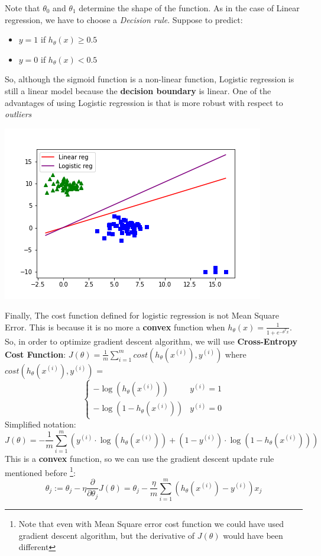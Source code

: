 Note that $\theta_{0}$ and $\theta_{1}$ determine the shape of the function.\newline
As in the case of Linear regression, we have to choose a \textit{Decision rule}. Suppose to predict: 
\begin{itemize}
    \item $y = 1$ if $h_{\theta}(x) \geq 0.5$
    \item $y = 0$ if $h_{\theta}(x) < 0.5$ 
\end{itemize}
So, although the sigmoid function is a non-linear function, Logistic regression is still a linear model because the \textbf{decision boundary} is linear. One of the advantages of using Logistic regression is that is more robust with respect to \textit{outliers}
\begin{center}
    \includegraphics[scale=0.7]{images/linear vs log.png}
\end{center}
Finally, The cost function defined for logistic regression is not Mean Square Error. This is because it is no more a \textbf{convex} function when $h_{\theta}(x) = \frac{1}{1 + e^{-\theta^{T}x}}$. So, in order to optimize gradient descent algorithm, we will use \textbf{Cross-Entropy Cost Function}: $J(\theta) = \frac{1}{m} \sum_{i = 1}^{m}cost(h_{\theta}(x^{(i)}), y^{(i)})$ \newline
where $cost(h_{\theta}(x^{(i)}), y^{(i)})$ = 
\[
    \begin{cases}
         - \log(h_{\theta}(x^{(i)}))  & y^{(i)} = 1\\
         - \log(1 - h_{\theta}(x^{(i)})) & y^{(i)} = 0
    \end{cases}
\]
Simplified notation:
\[J(\theta) = - \frac{1}{m}\sum_{i=1}^{m}( y^{(i)} \cdot \log(h_{\theta}(x^{(i)})) + (1 - y^{(i)}) \cdot \log(1 - h_{\theta}(x^{(i)}))  )\]
This is a \textbf{convex} function, so we can use the gradient descent update rule mentioned before \footnote{Note that even with Mean Square error cost function we could have used gradient descent algorithm, but the derivative of $J(\theta)$ would have been different}:
\[\theta_{j} := \theta_{j} - \eta \frac{\partial}{\partial \theta_{j}}J(\theta) = \theta_{j} - \frac{\eta}{m}\sum_{i=1}^{m}(h_{\theta}(x^{(i)}) - y^{(i)})x_{j}\]

